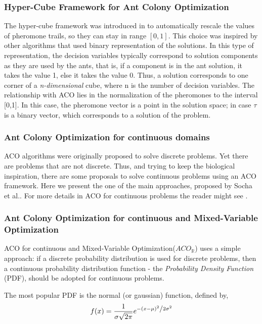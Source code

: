 					\subsubsection*{Hyper-Cube Framework for Ant Colony Optimization}
					The hyper-cube framework was introduced in \cite{blum04} to automatically rescale the values of pheromone trails, so they can stay in range $[0,1]$. This choice was inspired by other algorithms that used binary representation of the solutions. In this type of representation, the decision variables typically correspond to solution components as they are used by the ants, that is, if a component is in the ant solution, it takes the value 1, else it takes the value 0. Thus, a solution corresponds to one corner of a \emph{n-dimensional} cube, where n is the number of decision variables.
					The relationship with ACO lies in the normalization of the pheromones to the interval [0,1]. In this case, the pheromone vector is a point in the solution space; in case $\tau$ is a binary vector, which corresponds to a solution of the problem.
					
					\subsubsection*{Ant Colony Optimization for continuous domains}
					ACO algorithms were originally proposed to solve discrete problems. Yet there are problems that are not discrete. Thus, and trying to keep the biological inspiration, there are some proposals to solve continuous problems using an ACO framework. 
					Here we present the one of the main approaches, proposed by Socha et al.\cite{socha04}. For more details in ACO for continuous problems the reader might see \cite{bilchev95, kong06, tsutsui04}.
					
					
					\subsubsection*{Ant Colony Optimization for continuous and Mixed-Variable Optimization}
					 ACO for continuous and Mixed-Variable Optimization($ACO_\mathbb{R}$) uses a simple approach: if a discrete probability distribution is used for discrete problems, then a continuous probability distribution function - the \emph{Probability Density Function} (PDF), should be adopted for continuous problems.

					The most popular PDF is the normal (or gaussian) function, defined by,
						\begin{equation}
							f(x) = \frac{1}{{\sigma \sqrt {2\pi } }}e^{{{ - \left( {x - \mu } \right)^2 } \mathord{\left/ 				{\vphantom {{ - \left( {x - \mu } \right)^2 } {2\sigma ^2 }}} \right. \kern-\nulldelimiterspace} {2\sigma ^2 }}}
						\end{equation}

